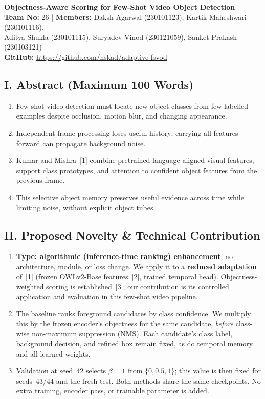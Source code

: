 \documentclass[8pt,a4paper]{article}
\begin{document}
\thispagestyle{empty}

\begin{center}
{\large\bfseries
Objectness-Aware Scoring for Few-Shot Video Object Detection}\\[4pt]
\textbf{Team No:} 26
\quad | \quad
\textbf{Members:}
Daksh Agarwal (230101123), Kartik Maheshwari (230101116),\\
Aditya Shukla (230101115), Suryadev Vinod (230121059), Sanket Prakash (230103121)\\[3pt]
\textbf{GitHub:}
\url{https://github.com/hskad/adaptive-fsvod}
\end{center}
\vspace{-5pt}

\subsection*{I. Abstract (Maximum 100 Words)}
\begin{enumerate}
    \item Few-shot video detection must locate new object classes from few labelled examples despite occlusion, motion blur, and changing appearance.
    \item Independent frame processing loses useful history; carrying all features forward can propagate background noise.
    \item Kumar and Mishra~[1] combine pretrained language-aligned visual features, support class prototypes, and attention to confident object features from the previous frame.
    \item This selective object memory preserves useful evidence across time while limiting noise, without explicit object tubes.
\end{enumerate}

\subsection*{II. Proposed Novelty \& Technical Contribution}
\begin{enumerate}
    \item \textbf{Type: algorithmic (inference-time ranking) enhancement}; no architecture, module, or loss change. We apply it to a \textbf{reduced adaptation} of~[1] (frozen OWLv2-Base features~[2], trained temporal head). Objectness-weighted scoring is established~[3]; our contribution is its controlled application and evaluation in this few-shot video pipeline.
    \item The baseline ranks foreground candidates by class confidence. We multiply this by the frozen encoder's objectness for the same candidate, \emph{before} class-wise non-maximum suppression (NMS). Each candidate's class label, background decision, and refined box remain fixed, as do temporal memory and all learned weights.
    \item Validation at seed~42 selects $\beta=1$ from $\{0,0.5,1\}$; this value is then fixed for seeds~43/44 and the fresh test. Both methods share the same checkpoints. No extra training, encoder pass, or trainable parameter is added.
\end{enumerate}
\end{document}
